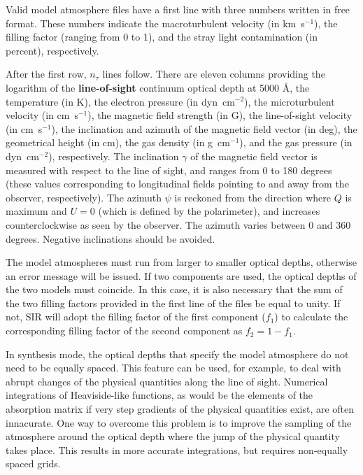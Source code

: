 Valid model atmosphere files have a first line with three numbers
written in free format. These numbers indicate the macroturbulent
velocity (in km~s$^{-1}$), the filling factor (ranging from 0 to 1),
and the stray light contamination (in percent), respectively.

After the first row, $n_\tau$ lines follow. There are eleven columns 
providing the logarithm of the {\bf line-of-sight} continuum 
optical depth at 5000 \AA\/, the temperature (in K), the 
electron pressure (in dyn~cm$^{-2}$), the microturbulent velocity (in
cm~s$^{-1}$), the magnetic field strength (in G), the line-of-sight
velocity (in cm~s$^{-1}$), the inclination and azimuth of the
magnetic field vector (in deg), the geometrical height (in cm), the 
gas density (in g~cm$^{-1}$), and the gas pressure (in dyn~cm$^{-2}$), 
respectively. The inclination $\gamma$ of the magnetic field vector is 
measured with respect to the line of sight, and ranges from 0 to 180 
degrees (these values corresponding to longitudinal fields pointing to
and away from the observer, respectively). The azimuth 
$\psi$ is reckoned from the direction where $Q$ is maximum and $U=0$ 
(which is defined by the polarimeter), and increases counterclockwise 
as seen by the observer. The azimuth varies between 0 and 360 degrees.  
Negative inclinations should be avoided. 

The model atmospheres must run from larger to smaller optical depths,
otherwise an error message will be issued. If two components are 
used, the optical depths of the two models must coincide. In this
case, it is also necessary that the sum of the two filling factors
provided in the first line of the files be equal to unity. If not, SIR
will adopt the filling factor of the first component ($f_1$) to 
calculate the corresponding filling factor of the second component
as $f_2 = 1 - f_1$.

In synthesis mode, the optical depths that specify the model atmosphere
do not need to be equally spaced. This feature can be used, for
example, to deal with abrupt changes of the physical quantities along
the line of sight. Numerical integrations of Heaviside-like functions, 
as would be the elements of the absorption matrix if very step
gradients of the physical quantities exist, are often innacurate. One
way to overcome this problem is to improve the sampling of the
atmosphere around the optical depth where the jump of the physical
quantity takes place. This results in more accurate integrations, but
requires non-equally spaced grids.

